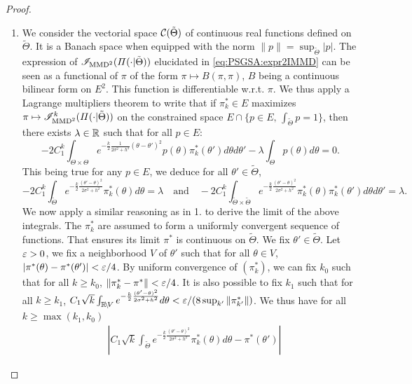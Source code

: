 \begin{proof}
\begin{enumerate}
\item We consider the vectorial space $\mathcal{C}(\tilde\Theta)$ of continuous real functions defined on $\tilde\Theta$. It is a Banach space when equipped with the norm $\|p\|=\sup_{\tilde\Theta}|p|$. The expression of $\mathscr{I}_{\text{MMD}^2}(\varPi(\cdot|\tilde\Theta))$ elucidated in \cref{eq:PSGSA:expr2IMMD} can be seen as a functional of $\pi$ of the form $\pi\mapsto B(\pi,\pi)$, $B$ being a continuous bilinear form on $E^2$. This function is differentiable w.r.t. $\pi$. We thus  apply a Lagrange multipliers theorem to write that if $\pi_k^\ast\in E$ maximizes $\pi\mapsto\mathscr{I}^k_{\text{MMD}^2}(\varPi(\cdot|\tilde\Theta))$ on the constrained space $E\cap\{p\in E,\,\int_{\tilde\Theta}p=1\}$, then there exists $\lambda\in\mathbb{R}$ such that for all $p\in E$:
\begin{equation}
    -2C_1^k\int_{\Theta\times\Theta} e^{-\frac{k}{2}\frac{1}{2\sigma^2+h^2}(\theta-\theta')^2} p(\theta)\pi^\ast_k(\theta')d\theta d\theta' - \lambda\int_\Theta p(\theta)d\theta = 0.
\end{equation}
This being true for any $p\in E$, we deduce for all $\theta'\in\tilde\Theta$, %
    \begin{equation}
        -2C_1^k\int_{\tilde\Theta} e^{-\frac{k}{2}\frac{(\theta'-\theta)^2}{2\sigma^2+h^2}} \pi_k^\ast(\theta)d\theta = \lambda \quad\text{and}\quad
        -2C_1^k\int_{\tilde\Theta\times\tilde\Theta} e^{-\frac{k}{2}\frac{(\theta'-\theta)^2}{2\sigma^2+h^2}} \pi_k^\ast(\theta)\pi_k^\ast(\theta')d\theta d\theta' = \lambda.
    \end{equation}
We now apply a similar reasoning as in 1. to derive the limit of the above integrals. 
The $\pi^\ast_k$ are assumed to form a uniformly convergent sequence of functions. That ensures its limit $\pi^\ast$ is continuous on $\tilde\Theta$.
We fix $\theta'\in\tilde\Theta$. Let $\varepsilon>0$, we fix a neighborhood $V$ of $\theta'$ such that for all $\theta \in V$, $|\pi^\ast(\theta)-\pi^\ast(\theta')|<\varepsilon/4$. By uniform convergence of $(\pi^\ast_k)$, we can fix $k_0$ such that for all $k\geq k_0$, $\|\pi^\ast_k-\pi^\ast\|<\varepsilon/4$. It is also possible to fix $k_1$ such that for all $k\geq k_1$, $C_1\sqrt{k}\int_{\mathbb{R}\!\setminus\!V} e^{-\frac{k}{2}\frac{(\theta'-\theta)^2}{2\sigma^2+h^2}}d\theta <\varepsilon/(8\sup_{k'}\|\pi^\ast_{k'}\|)$.
    We thus have for all $k\geq\max(k_1,k_0)$
    \begin{equation}
        \begin{aligned}
        &\left|C_1\sqrt{k}\int_{\tilde\Theta } e^{-\frac{k}{2}\frac{(\theta'-\theta)^2}{2\sigma^2+h^2}} \pi^\ast_k(\theta)d\theta - \pi^\ast(\theta') \right| 

\end{aligned}
\end{equation}
\end{enumerate}
\end{proof}
